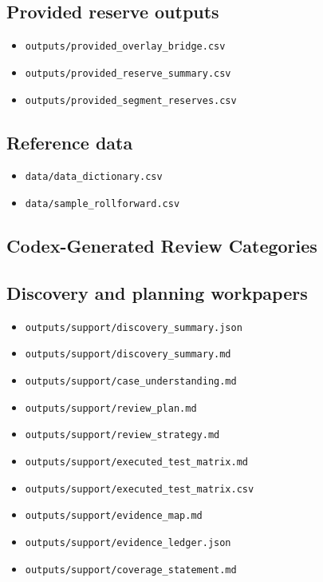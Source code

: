 \documentclass[11pt]{article}
\begin{document}
\subsection*{Provided reserve outputs}
\begin{itemize}
\item \texttt{outputs/provided\_overlay\_bridge.csv}
\item \texttt{outputs/provided\_reserve\_summary.csv}
\item \texttt{outputs/provided\_segment\_reserves.csv}
\end{itemize}
\subsection*{Reference data}
\begin{itemize}
\item \texttt{data/data\_dictionary.csv}
\item \texttt{data/sample\_rollforward.csv}
\end{itemize}
\subsection*{Codex-Generated Review Categories}
\subsection*{Discovery and planning workpapers}
\begin{itemize}
\item \texttt{outputs/support/discovery\_summary.json}
\item \texttt{outputs/support/discovery\_summary.md}
\item \texttt{outputs/support/case\_understanding.md}
\item \texttt{outputs/support/review\_plan.md}
\item \texttt{outputs/support/review\_strategy.md}
\item \texttt{outputs/support/executed\_test\_matrix.md}
\item \texttt{outputs/support/executed\_test\_matrix.csv}
\item \texttt{outputs/support/evidence\_map.md}
\item \texttt{outputs/support/evidence\_ledger.json}
\item \texttt{outputs/support/coverage\_statement.md}
\end{itemize}
\end{document}
